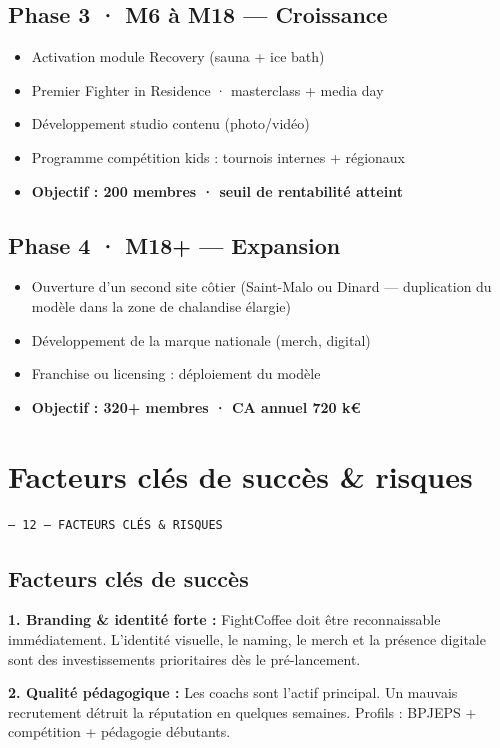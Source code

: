 \documentclass[11pt, a4paper]{article}
\newcommand{\eyebrow}[1]{%
  \vspace{4pt}
  {\small\color{fc-ink3}\texttt{— #1}}
  \vspace{2pt}
}
\begin{document}
\subsection{Phase 3 · M6 à M18 — Croissance}
\begin{itemize}
  \item Activation module Recovery (sauna + ice bath)
  \item Premier Fighter in Residence · masterclass + media day
  \item Développement studio contenu (photo/vidéo)
  \item Programme compétition kids : tournois internes + régionaux
  \item \textbf{Objectif : 200 membres · seuil de rentabilité atteint}
\end{itemize}

\subsection{Phase 4 · M18+ — Expansion}
\begin{itemize}
  \item Ouverture d'un second site côtier (Saint-Malo ou Dinard — duplication du modèle dans la zone de chalandise élargie)
  \item Développement de la marque nationale (merch, digital)
  \item Franchise ou licensing : déploiement du modèle
  \item \textbf{Objectif : 320+ membres · CA annuel 720 k€}
\end{itemize}

\section{Facteurs clés de succès \& risques}
\eyebrow{12 — FACTEURS CLÉS \& RISQUES}

\subsection{Facteurs clés de succès}

\textbf{1. Branding \& identité forte :} FightCoffee doit être reconnaissable immédiatement. L'identité visuelle, le naming, le merch et la présence digitale sont des investissements prioritaires dès le pré-lancement.

\textbf{2. Qualité pédagogique :} Les coachs sont l'actif principal. Un mauvais recrutement détruit la réputation en quelques semaines. Profils : BPJEPS + compétition + pédagogie débutants.
\end{document}
